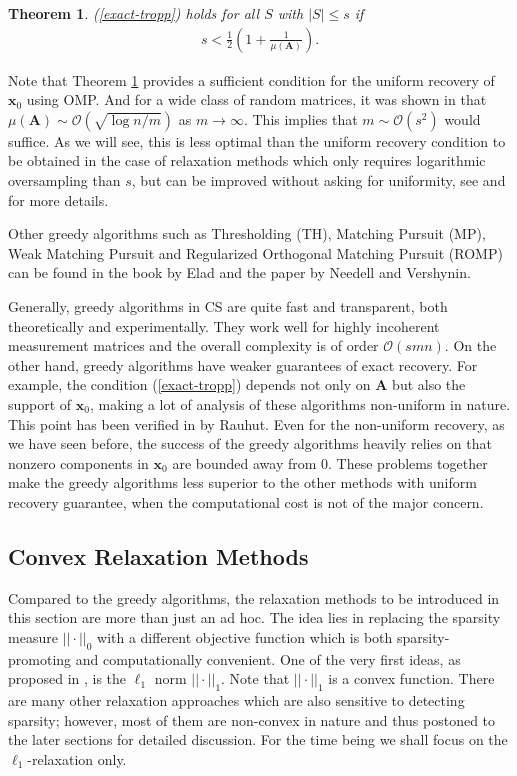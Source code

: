 \documentclass[11pt]{article}
\numberwithin{equation}{section}
\theoremstyle{plain}
\newtheorem{Th}{Theorem}[section]
\theoremstyle{definition}
\def\A{{\mathbf A}}
\def\x{{\mathbf x}}
\begin{document}
\begin{Th}\label{unif-OMP}
(\ref{exact-tropp}) holds for all $S$ with $|S|\leq s$ if 
\begin{align*}
s<\frac{1}{2}\left(1+\frac{1}{\mu(\A)}\right).
\end{align*} 
\end{Th}
Note that Theorem \ref{unif-OMP} provides a sufficient condition for the uniform recovery of $\x_0$ using OMP. And for a wide class of random matrices, it was shown in \cite{cai2011limiting} that $\mu(\A)\sim\mathcal{O}(\sqrt{\log n/m})$ as $m\rightarrow\infty$. This implies that $m\sim\mathcal{O}(s^2)$ would suffice. As we will see, this is less optimal than the uniform recovery condition to be obtained in the case of relaxation methods which only requires logarithmic oversampling than $s$, but can be improved without asking for uniformity, see \cite{tropp2007signal} and \cite{cohen2009compressed} for more details. 

Other greedy algorithms such as Thresholding (TH), Matching Pursuit (MP), Weak Matching Pursuit and Regularized Orthogonal Matching Pursuit (ROMP) can be found in the book \cite{elad2010sparse} by Elad and the paper \cite{needell2009uniform} by Needell and Vershynin.

Generally, greedy algorithms in CS are quite fast and transparent, both theoretically and experimentally. They work well for highly incoherent measurement matrices and the overall complexity is of order $\mathcal{O}(smn)$. On the other hand, greedy algorithms have weaker guarantees of exact recovery. For example, the condition (\ref{exact-tropp}) depends not only on $\A$ but also the support of $\x_0$, making a lot of analysis of these algorithms non-uniform in nature. This point has been verified in \cite{rauhut2008impossibility} by Rauhut. Even for the non-uniform recovery, as we have seen before, the success of the greedy algorithms heavily relies on that nonzero components in $\x_0$ are bounded away from $0$. These problems together make the greedy algorithms less superior to the other methods with uniform recovery guarantee, when the computational cost is not of the major concern.    



\subsection{Convex Relaxation Methods}\label{l1-section}
  
Compared to the greedy algorithms, the relaxation methods to be introduced in this section are more than just an ad hoc. The idea lies in replacing the sparsity measure $|| \cdot||_0$ with a different objective function which is both sparsity-promoting and computationally convenient. One of the very first ideas, as proposed in \cite{donoho2006compressed}, is the $\ell_1$ norm $|| \cdot||_1$. Note that $|| \cdot||_1$ is a convex function. There are many other relaxation approaches which are also sensitive to detecting sparsity; however, most of them are non-convex in nature and thus postoned to the later sections for detailed discussion. For the time being we shall focus on the $\ell_1$-relaxation only.
\end{document}
